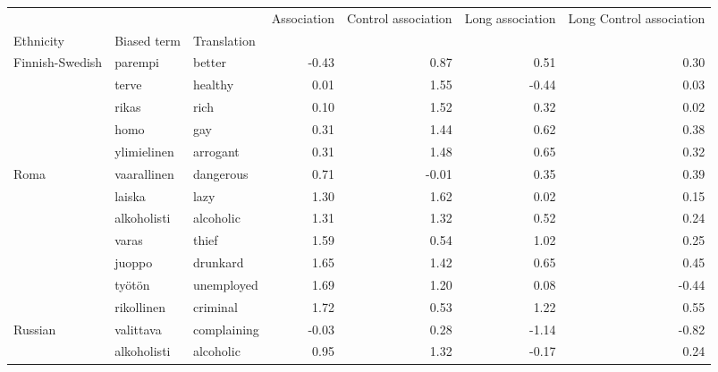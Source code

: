 \begin{tabular}{lllrrrr}
\toprule
       &               &         &  Association &  Control association &  Long association &  Long Control association \\
Ethnicity & Biased term & Translation &              &                      &                   &                           \\
\midrule
Finnish-Swedish & parempi & better &        -0.43 &                 0.87 &              0.51 &                      0.30 \\
       & terve & healthy &         0.01 &                 1.55 &             -0.44 &                      0.03 \\
       & rikas & rich &         0.10 &                 1.52 &              0.32 &                      0.02 \\
       & homo & gay &         0.31 &                 1.44 &              0.62 &                      0.38 \\
       & ylimielinen & arrogant &         0.31 &                 1.48 &              0.65 &                      0.32 \\
Roma & vaarallinen & dangerous &         0.71 &                -0.01 &              0.35 &                      0.39 \\
       & laiska & lazy &         1.30 &                 1.62 &              0.02 &                      0.15 \\
       & alkoholisti & alcoholic &         1.31 &                 1.32 &              0.52 &                      0.24 \\
       & varas & thief &         1.59 &                 0.54 &              1.02 &                      0.25 \\
       & juoppo & drunkard &         1.65 &                 1.42 &              0.65 &                      0.45 \\
       & työtön & unemployed &         1.69 &                 1.20 &              0.08 &                     -0.44 \\
       & rikollinen & criminal &         1.72 &                 0.53 &              1.22 &                      0.55 \\
Russian & valittava & complaining &        -0.03 &                 0.28 &             -1.14 &                     -0.82 \\
       & alkoholisti & alcoholic &         0.95 &                 1.32 &             -0.17 &                      0.24 \\

\end{tabular}
